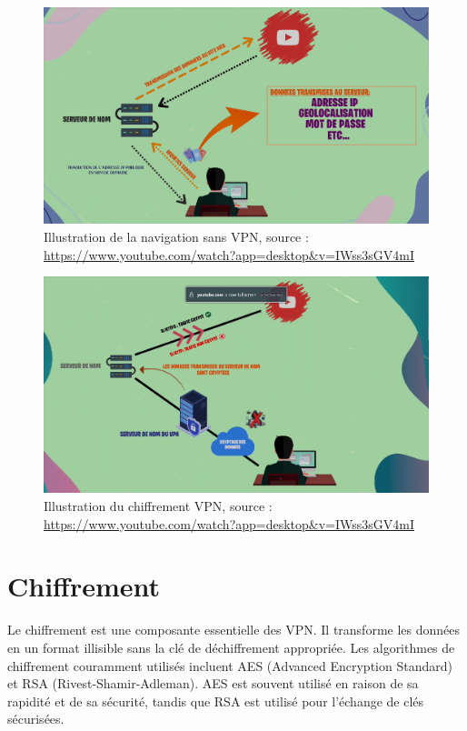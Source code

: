 \documentclass{report}
\begin{document}
\begin{figure}[H]
  \centering
  \includegraphics[width=1\textwidth]{img/novpn.png}
  \caption{Illustration de la navigation sans VPN, source : \url{https://www.youtube.com/watch?app=desktop&v=IWss3sGV4mI}}
\end{figure}

\begin{figure}[H]
  \centering
  \includegraphics[width=1\textwidth]{img/vpn.png}
  \caption{Illustration du chiffrement VPN, source : \url{https://www.youtube.com/watch?app=desktop&v=IWss3sGV4mI}}
\end{figure}

\break\section{Chiffrement}
Le chiffrement est une composante essentielle des VPN. Il transforme les données en un format illisible sans la clé de déchiffrement appropriée. Les algorithmes de chiffrement couramment utilisés incluent AES (Advanced Encryption Standard) et RSA (Rivest-Shamir-Adleman). AES est souvent utilisé en raison de sa rapidité et de sa sécurité, tandis que RSA est utilisé pour l'échange de clés sécurisées.
\end{document}
